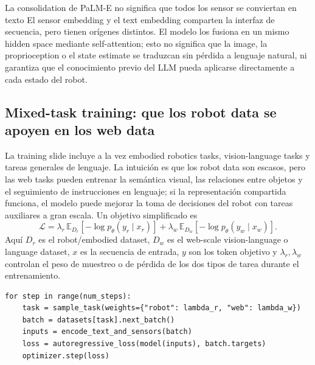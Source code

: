 
\begin{importantbox}{La consolidation de PaLM-E no significa que todos los sensor se conviertan en texto}
El sensor embedding y el text embedding comparten la interfaz de secuencia, pero tienen orígenes distintos. El modelo los fusiona en un mismo hidden space mediante self-attention; esto no significa que la image, la proprioception o el state estimate se traduzcan sin pérdida a lenguaje natural, ni garantiza que el conocimiento previo del LLM pueda aplicarse directamente a cada estado del robot.
\end{importantbox}

\subsection{Mixed-task training: que los robot data se apoyen en los web data}

La training slide incluye a la vez embodied robotics tasks, vision-language tasks y tareas generales de lenguaje. La intuición es que los robot data son escasos, pero las web tasks pueden entrenar la semántica visual, las relaciones entre objetos y el seguimiento de instrucciones en lenguaje; si la representación compartida funciona, el modelo puede mejorar la toma de decisiones del robot con tareas auxiliares a gran escala. Un objetivo simplificado es
$$
\mathcal{L}=\lambda_r\,\mathbb{E}_{D_r}\!\left[-\log p_\theta(y_r\mid x_r)\right]
+\lambda_w\,\mathbb{E}_{D_w}\!\left[-\log p_\theta(y_w\mid x_w)\right].
$$
Aquí $D_r$ es el robot/embodied dataset, $D_w$ es el web-scale vision-language o language dataset, $x$ es la secuencia de entrada, $y$ son los token objetivo y $\lambda_r,\lambda_w$ controlan el peso de muestreo o de pérdida de los dos tipos de tarea durante el entrenamiento.



\begin{lstlisting}[caption={Pseudocódigo conceptual del muestreador de entrenamiento multitarea}]
for step in range(num_steps):
    task = sample_task(weights={"robot": lambda_r, "web": lambda_w})
    batch = datasets[task].next_batch()
    inputs = encode_text_and_sensors(batch)
    loss = autoregressive_loss(model(inputs), batch.targets)
    optimizer.step(loss)
\end{lstlisting}

